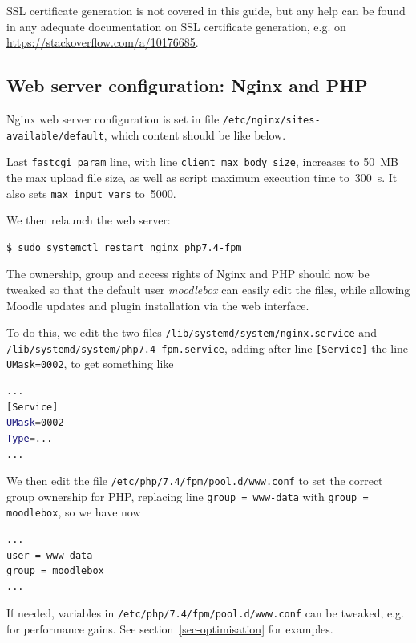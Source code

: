 \documentclass[12pt]{article}
\begin{document}
SSL certificate generation is not covered in this guide, but any help can be 
found in any adequate documentation on SSL certificate generation, e.g. on \url{https://stackoverflow.com/a/10176685}.

\subsection{Web server configuration: Nginx and PHP}

Nginx web server configuration is set in file \lstinline{/etc/nginx/sites-available/default}, which content should be like below.


Last \lstinline{fastcgi_param} line, with line \lstinline{client_max_body_size}, increases to 50~MB the max upload file size, as well as script maximum execution time to~300~s.
It also sets \lstinline{max_input_vars} to~5000.

We then relaunch the web server:
\begin{lstlisting}[language=bash]
$ sudo systemctl restart nginx php7.4-fpm
\end{lstlisting}

The ownership, group and access rights of Nginx and PHP should now be tweaked so that the default user \emph{moodlebox} can easily edit the files, while allowing Moodle updates and plugin installation via the web interface.

To do this, we edit the two files \lstinline{/lib/systemd/system/nginx.service} and \lstinline{/lib/systemd/system/php7.4-fpm.service}, adding after line \lstinline{[Service]} the line \lstinline{UMask=0002}, to get something like
\begin{lstlisting}[language=bash]
...
[Service]
UMask=0002
Type=...
...
\end{lstlisting}
We then edit the file \lstinline{/etc/php/7.4/fpm/pool.d/www.conf} to set the correct group ownership for PHP, replacing line \lstinline{group = www-data} with \lstinline{group = moodlebox}, so we have now
\begin{lstlisting}[language=bash]
...
user = www-data
group = moodlebox
...
\end{lstlisting}
If needed, variables in \lstinline{/etc/php/7.4/fpm/pool.d/www.conf} can be tweaked, e.g. for performance gains. See section~\ref{sec-optimisation} for examples.
\end{document}
